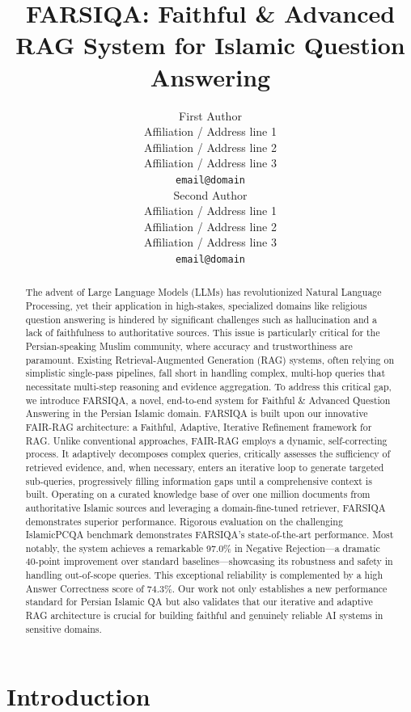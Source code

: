 \documentclass[11pt]{article}
\title{FARSIQA: Faithful \& Advanced RAG System for Islamic Question Answering}
\author{First Author \\
  Affiliation / Address line 1 \\
  Affiliation / Address line 2 \\
  Affiliation / Address line 3 \\
  \texttt{email@domain} \\\And
  Second Author \\
  Affiliation / Address line 1 \\
  Affiliation / Address line 2 \\
  Affiliation / Address line 3 \\
  \texttt{email@domain} \\}
\begin{document}
\maketitle
\begin{abstract}
The advent of Large Language Models (LLMs) has revolutionized Natural Language Processing, yet their application in high-stakes, specialized domains like religious question answering is hindered by significant challenges such as hallucination and a lack of faithfulness to authoritative sources. This issue is particularly critical for the Persian-speaking Muslim community, where accuracy and trustworthiness are paramount. Existing Retrieval-Augmented Generation (RAG) systems, often relying on simplistic single-pass pipelines, fall short in handling complex, multi-hop queries that necessitate multi-step reasoning and evidence aggregation. To address this critical gap, we introduce FARSIQA, a novel, end-to-end system for Faithful \& Advanced Question Answering in the Persian Islamic domain. FARSIQA is built upon our innovative FAIR-RAG architecture: a Faithful, Adaptive, Iterative Refinement framework for RAG. Unlike conventional approaches, FAIR-RAG employs a dynamic, self-correcting process. It adaptively decomposes complex queries, critically assesses the sufficiency of retrieved evidence, and, when necessary, enters an iterative loop to generate targeted sub-queries, progressively filling information gaps until a comprehensive context is built. Operating on a curated knowledge base of over one million documents from authoritative Islamic sources and leveraging a domain-fine-tuned retriever, FARSIQA demonstrates superior performance. Rigorous evaluation on the challenging IslamicPCQA benchmark demonstrates FARSIQA's state-of-the-art performance. Most notably, the system achieves a remarkable 97.0\% in Negative Rejection---a dramatic 40-point improvement over standard baselines---showcasing its robustness and safety in handling out-of-scope queries. This exceptional reliability is complemented by a high Answer Correctness score of 74.3\%. Our work not only establishes a new performance standard for Persian Islamic QA but also validates that our iterative and adaptive RAG architecture is crucial for building faithful and genuinely reliable AI systems in sensitive domains.
\end{abstract}

\section{Introduction}
\end{document}
